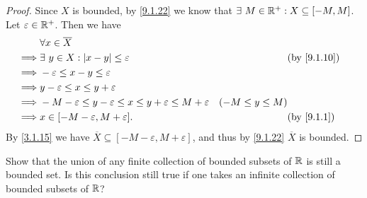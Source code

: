 \begin{proof}
  Since \(X\) is bounded, by \cref{9.1.22} we know that \(\exists\ M \in \mathbb{R}^+ : X \subseteq [-M, M]\).
  Let \(\varepsilon \in \mathbb{R}^+\).
  Then we have
  \begin{align*}
             & \forall x \in \overline{X}                                                                                                              \\
    \implies & \exists\ y \in X : \abs{x - y} \leq \varepsilon                                        &                    & \text{(by \cref{9.1.10})} \\
    \implies & -\varepsilon \leq x - y \leq \varepsilon                                                                                                \\
    \implies & y - \varepsilon \leq x \leq y + \varepsilon                                                                                             \\
    \implies & -M - \varepsilon \leq y - \varepsilon \leq x \leq y + \varepsilon \leq M + \varepsilon & (-M \leq y \leq M)                             \\
    \implies & x \in [-M - \varepsilon, M + \varepsilon].                                             &                    & \text{(by \cref{9.1.1})}
  \end{align*}
  By \cref{3.1.15} we have \(\overline{X} \subseteq [-M - \varepsilon, M + \varepsilon]\), and thus by \cref{9.1.22} \(\overline{X}\) is bounded.
\end{proof}

\begin{ex}\label{ex:9.1.12}
  Show that the union of any finite collection of bounded subsets of \(\mathbb{R}\) is still a bounded set.
  Is this conclusion still true if one takes an infinite collection of bounded subsets of \(\mathbb{R}\)?
\end{ex}

